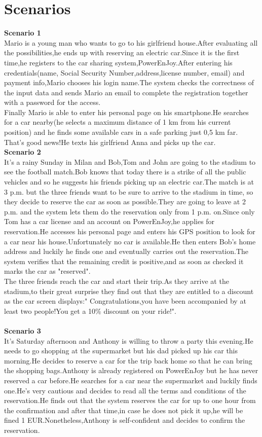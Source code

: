 \documentclass[11pt,a4paper]{report}
\begin{document}
\chapter{Scenarios}
\textbf{Scenario 1}\\
Mario is a young man who wants to go to his girlfriend house.After evaluating all the possibilities,he ends up with reserving an electric car.Since it is the first time,he registers to the car sharing system,PowerEnJoy.After entering his credentials(name, Social Security Number,address,license number, email) and payment info,Mario chooses his login name.The system checks the correctness of the input data and sends Mario an email to complete the registration together with a password for the access.\\
Finally Mario is able to enter his personal page on his smartphone.He searches for a car nearby(he selects a maximum distance of 1 km from his current position) and he finds some available cars in a safe parking just 0,5 km far. That's good news!He texts his girlfriend Anna and picks up the car. 
\noindent \\
\textbf{Scenario 2}\\
It's a rainy Sunday in Milan and Bob,Tom and John are going to the stadium to see the football match.Bob knows that today there is a strike of all the public vehicles and so he suggests his friends picking up an electric car.The match is at 3 p.m. but the three friends want to be sure to arrive to the stadium in time, so they decide to reserve the car as soon as possible.They are going to leave at 2 p.m. and the system lets them do the reservation only from 1 p.m. on.Since only Tom has a car license and an account on PowerEnJoy,he applies for reservation.He accesses his personal page and enters his GPS position to look for a car near his house.Unfortunately no car is available.He then enters Bob's home address and luckily he finds one and eventually carries out the reservation.The system verifies that the remaining credit is positive,and as soon as checked it marks the car as "reserved".\\ 
The three friends reach the car and start their trip.As they arrive at the stadium,to their great surprise they find out that they are entitled to a discount as the car screen displays:" Congratulations,you have been accompanied by at least two people!You get a 10\% discount on your ride!".\\ 
\noindent \\
\textbf{Scenario 3}\\
It's Saturday afternoon and Anthony is willing to throw a party this evening.He needs to go shopping at the supermarket but his dad picked up his car this morning.He decides to reserve a car for the trip back home so that he can bring the shopping bags.Anthony is already registered on PowerEnJoy but he has never reserved a car before.He searches for a car near the supermarket and luckily finds one.He's very cautious and decides to read all the terms and conditions of the reservation.He finds out that the system reserves the car for up to one hour from the confirmation and after that time,in case he does not pick it up,he will be fined 1 EUR.Nonetheless,Anthony is self-confident and decides to confirm the reservation.\\
\end{document}
